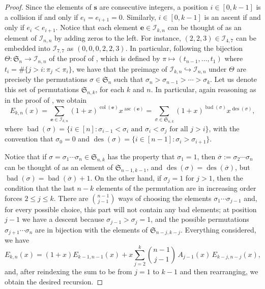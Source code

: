 \documentclass[11pt, a4paper, english]{amsart}
\theoremstyle{teoremas}
\theoremstyle{definition}
\newcommand{\col}{\operatorname{col}}
\newcommand{\asc}{\operatorname{asc}}
\newcommand{\bad}{\operatorname{bad}}
\newcommand{\des}{\operatorname{des}}
\begin{document}
\begin{proof}
    Since the elements of $\mathbf{s}$ are consecutive integers, a position $i\in [0,k-1]$ is a collision if and only if $e_i=e_{i+1}=0$. Similarly, $i\in [0,k-1]$ is an ascent if and only if $e_i < e_{i+1}$. Notice that each element $\mathbf{e}\in\mathcal{I}_{k,n}$ can be thought of as an element of $\mathcal{I}_{n,n}$ by adding zeros to the left. For instance, $(2,2,3)\in \mathcal{I}_{4,7}$ can be embedded into $\mathcal{I}_{7,7}$ as $(0,0,0,2,2,3)$.
    In particular, following the bijection $\Theta\colon\mathfrak{S}_n\to\mathcal{I}_{n,n}$ of the proof of \cite[Theorem~3.1]{haglund-zhang}, which is defined by $\pi \mapsto (t_{n-1},\ldots,t_1)$ where $t_i=\#\{j>i:\pi_j < \pi_i\}$, we have that the preimage of $\mathcal{I}_{k,n}\hookrightarrow\mathcal{I}_{n,n}$ under $\Theta$ are precisely the permutations $\sigma\in\mathfrak{S}_n$ such that $\sigma_n>\sigma_{n-1}>\cdots>\sigma_{k}$. Let us denote this set of permutations $\mathfrak{S}_{n,k}$, for each $k$ and $n$. In particular, again reasoning as in the proof of \cite[Theorem~3.1]{haglund-zhang}, we obtain
        \[ E_{k,n}(x) = \sum_{\mathbf{e}\in\mathcal{I}_{k,n}} (1+x)^{\col(\mathbf{e})} x^{\asc(\mathbf{e})} = \sum_{\sigma \in \mathfrak{S}_{n,k}} (1+x)^{\operatorname{bad}(\sigma)}x^{\operatorname{des}(\sigma)},\]
    where $\bad(\sigma)=\{ i\in [n] : \sigma_{i-1}<\sigma_i \text{ and } \sigma_i < \sigma_j \text{ for all } j > i\}$, with the convention that $\sigma_0=0$ and $\des(\sigma)=\{i\in [n-1]:\sigma_i>\sigma_{i+1}\}$. 
    
    Notice that if $\sigma=\sigma_1\cdots\sigma_n\in\mathfrak{S}_{n,k}$ has the property that $\sigma_1=1$, then $\overline{\sigma}:=\sigma_2\cdots\sigma_{n}$ can be thought of as an element of $\mathfrak{S}_{n-1,k-1}$, and $\des(\sigma)=\des(\overline{\sigma})$, but $\bad(\sigma)=\bad(\overline{\sigma})+1$. On the other hand, if $\sigma_j=1$ for $j > 1$, then the condition that the last $n-k$ elements of the permutation are in increasing order forces $2\leq j \leq k$. There are $\binom{n-1}{j-1}$ ways of choosing the elements $\sigma_1\cdots\sigma_{j-1}$ and, for every possible choice, this part will not contain any bad elements; at position $j-1$ we have a descent because $\sigma_{j-1}>\sigma_j=1$, and the possible permutations $\sigma_{j+1}\cdots\sigma_n$ are in bijection with the elements of $\mathfrak{S}_{n-j,k-j}$. Everything considered, we have
    \[ E_{k,n}(x) = (1+x)E_{k-1,n-1}(x) + x \sum_{j=2}^{k} \binom{n-1}{j-1}\,  A_{j-1}(x)\, E_{k-j,n-j}(x),\]
    and, after reindexing the sum to be from $j=1$ to $k-1$ and then rearranging, we obtain the desired recursion.
\end{proof}
\end{document}
